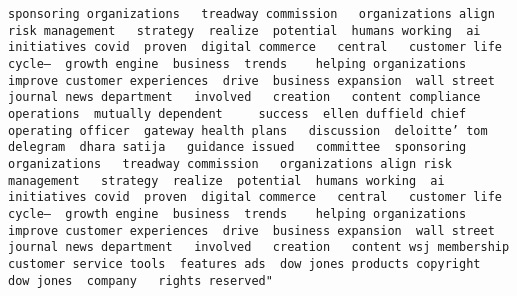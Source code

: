 \documentclass[
]{article}
\begin{document}
\begin{verbatim}
sponsoring organizations   treadway commission   organizations align risk management   strategy  realize  potential  humans working  ai initiatives covid  proven  digital commerce   central   customer life cycle—  growth engine  business  trends    helping organizations improve customer experiences  drive  business expansion  wall street journal news department   involved   creation   content compliance  operations  mutually dependent     success  ellen duffield chief operating officer  gateway health plans   discussion  deloitte’ tom delegram  dhara satija   guidance issued   committee  sponsoring organizations   treadway commission   organizations align risk management   strategy  realize  potential  humans working  ai initiatives covid  proven  digital commerce   central   customer life cycle—  growth engine  business  trends    helping organizations improve customer experiences  drive  business expansion  wall street journal news department   involved   creation   content wsj membership customer service tools  features ads  dow jones products copyright   dow jones  company   rights reserved"                                                                                                                                                                                                                                                                                                                                                                                                                                                                                                                                                                                                                                                                                                                                                                                                                                                                                                                                                                                                                                                                                                                                                                                                                                                                                                                                                                                                                                                                                                                                                                                                                                                                                                                                                                                                                                                                                                                                                                                                                                                                                                                                                                                                                                                                                               
\end{verbatim}
\end{document}
